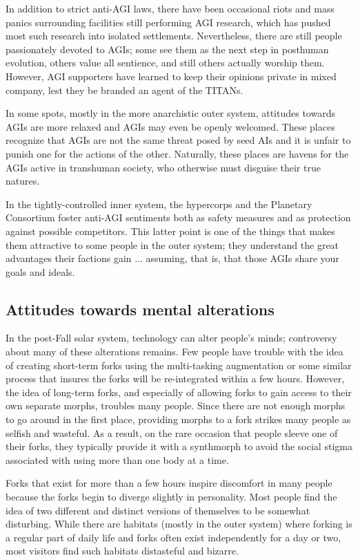In addition to strict anti-AGI laws, there have been occasional riots
and mass panics surrounding facilities still performing AGI research,
which has pushed most such research into isolated
settlements. Nevertheless, there are still people passionately devoted
to AGIs; some see them as the next step in posthuman evolution, others
value all sentience, and still others actually worship them. However,
AGI supporters have learned to keep their opinions private in mixed
company, lest they be branded an agent of the TITANs.

In some spots, mostly in the more anarchistic outer system, attitudes
towards AGIs are more relaxed and AGIs may even be openly
welcomed. These places recognize that AGIs are not the same threat
posed by seed AIs and it is unfair to punish one for the actions of
the other. Naturally, these places are havens for the AGIs active in
transhuman society, who otherwise must disguise their true natures.

In the tightly-controlled inner system, the hypercorps and the
Planetary Consortium foster anti-AGI sentiments both as safety
measures and as protection against possible competitors. This latter
point is one of the things that makes them attractive to some people
in the outer system; they understand the great advantages their
factions gain ... assuming, that is, that those AGIs share your goals
and ideals.

\subsection{Attitudes towards mental alterations}
\label{sec:attit-towards-ment}

In the post-Fall solar system, technology can alter people's minds;
controversy about many of these alterations remains. Few people have
trouble with the idea of creating short-term forks using the
multi-tasking augmentation or some similar process that insures the
forks will be re-integrated within a few hours.  However, the idea of
long-term forks, and especially of allowing forks to gain access to
their own separate morphs, troubles many people. Since there are not
enough morphs to go around in the first place, providing morphs to a
fork strikes many people as selfish and wasteful. As a result, on the
rare occasion that people sleeve one of their forks, they typically
provide it with a synthmorph to avoid the social stigma associated
with using more than one body at a time.

Forks that exist for more than a few hours inspire discomfort in many
people because the forks begin to diverge slightly in
personality. Most people find the idea of two different and distinct
versions of themselves to be somewhat disturbing. While there are
habitats (mostly in the outer system) where forking is a regular part
of daily life and forks often exist independently for a day or two,
most visitors find such habitats distasteful and bizarre.

